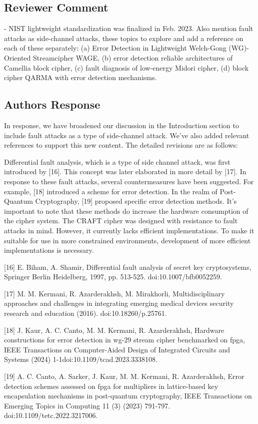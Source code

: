 \color{black}



\subsection{Reviewer Comment}
- NIST lightweight standardization was finalized in Feb. 2023. Also mention fault attacks as side-channel attacks, these topics to explore and add a reference on each of these separately: (a) Error Detection in Lightweight Welch-Gong (WG)-Oriented Streamcipher WAGE, (b) error detection reliable architectures of Camellia block cipher, (c) fault diagnosis of low-energy Midori cipher, (d) block cipher QARMA with error detection mechanisms.

\subsection{Authors Response}

In response, we have broadened our discussion in the Introduction section to include fault attacks as a type of side-channel attack. We've also added relevant references to support this new content. The detailed revisions are as follows:

\color{blue}

Differential fault analysis, which is a type of side channel attack, was first introduced by [16]. This concept was later elaborated in more detail by [17]. In response to these fault attacks, several countermeasures have been suggested. For example, [18] introduced a scheme for error detection. In the realm of Post-Quantum Cryptography, [19] proposed specific error detection methods. It's important to note that these methods do increase the hardware consumption of the cipher system. The CRAFT cipher was designed with resistance to fault attacks in mind. However, it currently lacks efficient implementations. To make it suitable for use in more constrained environments, development of more efficient implementations is necessary.

	[16] E. Biham, A. Shamir, Differential fault analysis of secret key cryptosystems, Springer Berlin Heidelberg, 1997, pp. 513-525. doi:10.1007/bfb0052259.


[17] M. M. Kermani, R. Azarderakhsh, M. Mirakhorli, Multidisciplinary approaches and challenges in integrating emerging medical devices security research and education (2016). \linebreak doi:10.18260/p.25761.


[18] J. Kaur, A. C. Canto, M. M. Kermani, R. Azarderakhsh, Hardware constructions for error detection in wg-29 stream cipher benchmarked on fpga, IEEE Transactions on Computer-Aided Design of Integrated Circuits and Systems (2024) 1-1doi:10.1109/tcad.2023.3338108.

[19] A. C. Canto, A. Sarker, J. Kaur, M. M. Kermani, R. Azarderakhsh, Error detection schemes assessed on fpga for multipliers in lattice-based key encapsulation mechanisms in post-quantum cryptography, IEEE Transactions on Emerging Topics in Computing 11 (3) (2023) 791-797. doi:10.1109/tetc.2022.3217006.


\color{black}


